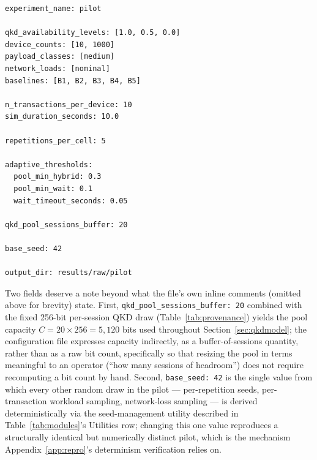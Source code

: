 \documentclass[journal]{IEEEtran}
\begin{document}
\begin{verbatim}
experiment_name: pilot

qkd_availability_levels: [1.0, 0.5, 0.0]
device_counts: [10, 1000]
payload_classes: [medium]
network_loads: [nominal]
baselines: [B1, B2, B3, B4, B5]

n_transactions_per_device: 10
sim_duration_seconds: 10.0

repetitions_per_cell: 5

adaptive_thresholds:
  pool_min_hybrid: 0.3
  pool_min_wait: 0.1
  wait_timeout_seconds: 0.05

qkd_pool_sessions_buffer: 20

base_seed: 42

output_dir: results/raw/pilot
\end{verbatim}

Two fields deserve a note beyond what the file's own inline comments (omitted above for brevity) state. First, \texttt{qkd\_pool\_sessions\_buffer: 20} combined with the fixed 256-bit per-session QKD draw (Table~\ref{tab:provenance}) yields the pool capacity $C = 20 \times 256 = 5{,}120$ bits used throughout Section~\ref{sec:qkdmodel}; the configuration file expresses capacity indirectly, as a buffer-of-sessions quantity, rather than as a raw bit count, specifically so that resizing the pool in terms meaningful to an operator (``how many sessions of headroom'') does not require recomputing a bit count by hand. Second, \texttt{base\_seed: 42} is the single value from which every other random draw in the pilot --- per-repetition seeds, per-transaction workload sampling, network-loss sampling --- is derived deterministically via the seed-management utility described in Table~\ref{tab:modules}'s Utilities row; changing this one value reproduces a structurally identical but numerically distinct pilot, which is the mechanism Appendix~\ref{app:repro}'s determinism verification relies on.



\end{document}

